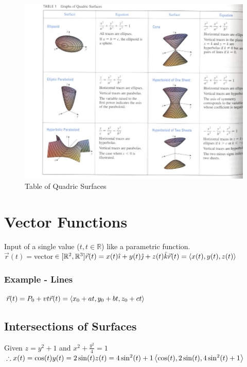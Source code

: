 \documentclass{article}
\newcommand{\nvec}[1]{\left\langle #1 \right\rangle}
\begin{document}
    \begin{figure}[h!]
        \includegraphics[scale=0.4]{quadricsurfaces.png}
        \caption{Table of Quadric Surfaces}
    \end{figure}

\newpage

\section{Vector Functions}
Input of a single value ($t,t\in\mathbb{R}$) like a parametric function.\\
$\vec{r}(t)=$vector$\in [\mathbb{R}^2,\mathbb{R}^3]\\
\vec{r}(t)=x(t)\hat{\imath} + y(t)\hat{\jmath} + z(t)\hat{k}\\
\vec{r}(t)=\nvec{x(t),y(t),z(t)}$
\subsubsection{Example - Lines}
$
\vec{r}(t)=P_0+vt\\
\vec{r}(t)=\nvec{x_0+at,y_0+bt,z_0+ct}
$

    \subsection{Intersections of Surfaces}
    Given $z=y^2+1$ and $x^2+\frac{y^2}{4}=1$\\
    $
    \therefore x(t)=\cos(t)\\
    y(t)=2\sin(t)\\
    z(t)=4\sin^2(t)+1\\
    \nvec{\cos(t),2\sin(t),4\sin^2(t)+1}\\
    $
\end{document}
